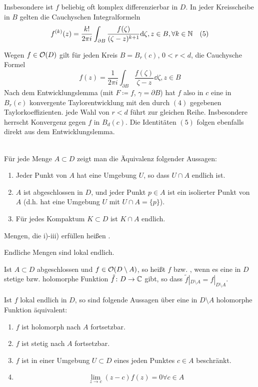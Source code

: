 Insbesondere ist $ f $ beliebig oft komplex differenzierbar in $ D $. In jeder Kreisscheibe in $ B $ gelten die Cauchyschen Integralformeln
\[ f^{(k)}(z)=\frac{k!}{2\pi i}\int_{\partial B}^{}\frac{f(\zeta)}{(\zeta-z)^{k+1}}\mathrm d\zeta, z\in B,\forall k\in\mathbb{N}\quad (5) \]
\begin{beweis}
	Wegen $ f\in\mathcal O(D) $ gilt f\"ur jeden Kreis $ B=B_r(c) $, $ 0<r<d $, die Cauchysche Formel
	\[ f(z)=\frac{1}{2\pi i}\int_{\partial B}^{}\frac{f(\zeta)}{\zeta-z}\dd\zeta,z\in B \]
	Nach dem Entwicklungslemma (mit $ F\coloneqq f $, $ \gamma=\partial B $) hat $ f $ also in $ c $ eine in $ B_r(c) $ konvergente Taylorentwicklung mit den durch $ (4) $ gegebenen Taylorkoeffizienten. jede Wahl von $ r<d $ f\"uhrt zur gleichen Reihe. Insbesondere herrscht Konvergenz gegen $ f $ in $ B_d(c) $. Die Identit\"aten $ (5) $ folgen ebenfalls direkt aus dem Entwicklungslemma.
\end{beweis}
\\
F\"ur jede Menge $ A\subset D $ zeigt man die \"Aquivalenz folgender Aussagen:
\begin{enumerate}
	\item Jeder Punkt von $ A $ hat eine Umgebung $ U $, so dass $ U\cap A $ endlich ist.
	\item $ A $ ist abgeschlossen in $ D $, und jeder Punkt $ p\in A $ ist ein isolierter Punkt von $ A $ (d.h. hat eine Umgebung $ U $ mit $ U\cap A=\lbrace p\rbrace $).
	\item F\"ur jedes Kompaktum $ K\subset D $ ist $ K\cap A $ endlich.
\end{enumerate}
\begin{definition}
	Mengen, die i)-iii) erf\"ullen hei\ss en .
\end{definition}
Endliche Mengen sind lokal endlich.
\newpage
\begin{definition}
	Ist $ A\subset D $ abgeschlossen und $ f\in\mathcal O(D\setminus A) $, so hei\ss t $ f $  bzw. , wenn es eine in $ D $ stetige bzw. holomorphe Funktion $ \tilde f\colon D\rightarrow\mathbb{C} $ gibt, so dass $ \tilde f|_{D\setminus A}=f|_{D\setminus A} $.
\end{definition}
\begin{satz}
	Ist $ f $ lokal endlich in $ D $, so sind folgende Aussagen \"uber eine in $ D\setminus A $ holomorphe Funktion \"aquivalent:
	\begin{enumerate}
		\item $ f $ ist holomorph nach $ A $ fortsetzbar.
		\item $ f $ ist stetig nach $ A $ fortsetzbar.
		\item $ f $ ist in einer Umgebung $ U\subset D $ eines jeden Punktes $ c\in A $ beschr\"ankt.
		\item \[ \lim_{z\to c}(z-c)f(z)=0\forall c\in A \]
	\end{enumerate}
\end{satz}
